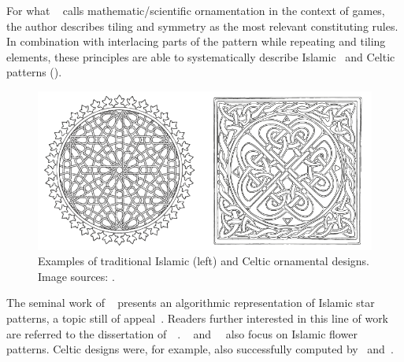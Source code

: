 For what \citeauthor*{whitehead_2010_tpd}~\cite{whitehead_2010_tpd} calls mathematic/scientific ornamentation in the context of games, the author 
% 
describes tiling and symmetry as the most relevant constituting rules. In combination with interlacing parts of the pattern while repeating and tiling elements, these principles are able to systematically describe Islamic~\cite{ostromoukhov_1998_mtc} and Celtic~\cite{cromwell_1993_ckm} patterns ().


\begin{figure}
\centering
    \includegraphics[width=0.9\columnwidth]{figures/islamic_celtic_ornament_01.png}
    \caption[Islamic and Celtic ornamental designs]{Examples of traditional Islamic (left) and Celtic ornamental designs. Image sources: \cite{islamic_ornament, celtic_ornament}.}
\label{fig:islamic_celtic_ornament}
\end{figure}

The seminal work of \citeauthor*{kaplan_2004_isp}~\cite{kaplan_2004_isp} presents an algorithmic representation of Islamic star patterns, a topic still of appeal~\cite{khamjane_2018_giq}. Readers further interested in this line of work are referred to the dissertation of~\citeauthor*{kaplan_2002_cgg}~\cite{kaplan_2002_cgg}. \citeauthor*{etemad_2008_apf}~\cite{etemad_2008_apf} and~\citeauthor*{hamekasi_2012_dpf}~\cite{hamekasi_2012_dpf} also focus on Islamic flower patterns. Celtic designs were, for example, also successfully computed by~\citeauthor*{kaplan_2003_cgc} and~\cite{doyle_2013_ccc}.

